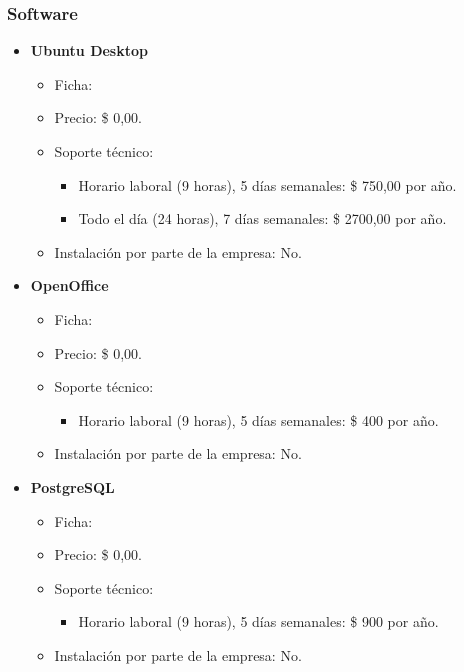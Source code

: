 \subsubsection{Software}
\begin{itemize}
  \item \textbf{Ubuntu Desktop}
    \begin{itemize}
      \item Ficha:
      \item Precio: \$ 0,00.
      \item Soporte técnico:
        \begin{itemize}
          \item Horario laboral (9 horas), 5 días semanales: \$ 750,00 por año.
          \item Todo el día (24 horas), 7 días semanales: \$ 2700,00 por año.
        \end{itemize}
      \item Instalación por parte de la empresa: No.
    \end{itemize}
    
  \item \textbf{OpenOffice}
    \begin{itemize}
      \item Ficha:
      \item Precio: \$ 0,00.
      \item Soporte técnico:
        \begin{itemize}
          \item Horario laboral (9 horas), 5 días semanales: \$ 400 por año.
        \end{itemize}
      \item Instalación por parte de la empresa: No.
    \end{itemize}
  
  \item \textbf{PostgreSQL}
    \begin{itemize}
      \item Ficha:
      \item Precio: \$ 0,00.
      \item Soporte técnico:
        \begin{itemize}
          \item Horario laboral (9 horas), 5 días semanales: \$ 900 por año.
        \end{itemize}
      \item Instalación por parte de la empresa: No.
    \end{itemize}
\end{itemize}

\pagebreak